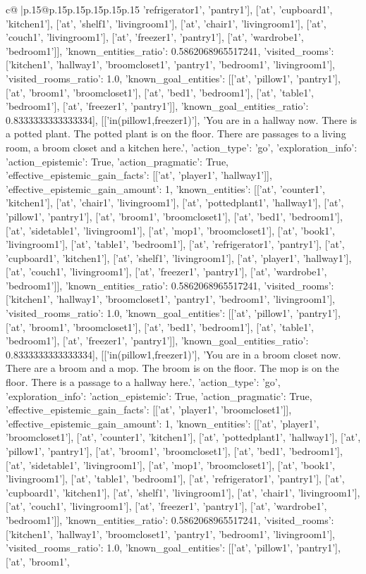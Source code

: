 \documentclass{article}
\begin{document}
{\begin{supertabular}{c@{$\;$}|p{.15\linewidth}@{}p{.15\linewidth}p{.15\linewidth}p{.15\linewidth}p{.15\linewidth}p{.15\linewidth}}
{{{'refrigerator1', 'pantry1'], ['at', 'cupboard1', 'kitchen1'], ['at', 'shelf1', 'livingroom1'], ['at', 'chair1', 'livingroom1'], ['at', 'couch1', 'livingroom1'], ['at', 'freezer1', 'pantry1'], ['at', 'wardrobe1', 'bedroom1']], 'known_entities_ratio': 0.5862068965517241, 'visited_rooms': ['kitchen1', 'hallway1', 'broomcloset1', 'pantry1', 'bedroom1', 'livingroom1'], 'visited_rooms_ratio': 1.0, 'known_goal_entities': [['at', 'pillow1', 'pantry1'], ['at', 'broom1', 'broomcloset1'], ['at', 'bed1', 'bedroom1'], ['at', 'table1', 'bedroom1'], ['at', 'freezer1', 'pantry1']], 'known_goal_entities_ratio': 0.8333333333333334}}], [['in(pillow1,freezer1)'], 'You are in a hallway now. There is a potted plant. The potted plant is on the floor. There are passages to a living room, a broom closet and a kitchen here.', {'action_type': 'go', 'exploration_info': {'action_epistemic': True, 'action_pragmatic': True, 'effective_epistemic_gain_facts': [['at', 'player1', 'hallway1']], 'effective_epistemic_gain_amount': 1, 'known_entities': [['at', 'counter1', 'kitchen1'], ['at', 'chair1', 'livingroom1'], ['at', 'pottedplant1', 'hallway1'], ['at', 'pillow1', 'pantry1'], ['at', 'broom1', 'broomcloset1'], ['at', 'bed1', 'bedroom1'], ['at', 'sidetable1', 'livingroom1'], ['at', 'mop1', 'broomcloset1'], ['at', 'book1', 'livingroom1'], ['at', 'table1', 'bedroom1'], ['at', 'refrigerator1', 'pantry1'], ['at', 'cupboard1', 'kitchen1'], ['at', 'shelf1', 'livingroom1'], ['at', 'player1', 'hallway1'], ['at', 'couch1', 'livingroom1'], ['at', 'freezer1', 'pantry1'], ['at', 'wardrobe1', 'bedroom1']], 'known_entities_ratio': 0.5862068965517241, 'visited_rooms': ['kitchen1', 'hallway1', 'broomcloset1', 'pantry1', 'bedroom1', 'livingroom1'], 'visited_rooms_ratio': 1.0, 'known_goal_entities': [['at', 'pillow1', 'pantry1'], ['at', 'broom1', 'broomcloset1'], ['at', 'bed1', 'bedroom1'], ['at', 'table1', 'bedroom1'], ['at', 'freezer1', 'pantry1']], 'known_goal_entities_ratio': 0.8333333333333334}}], [['in(pillow1,freezer1)'], 'You are in a broom closet now. There are a broom and a mop. The broom is on the floor. The mop is on the floor. There is a passage to a hallway here.', {'action_type': 'go', 'exploration_info': {'action_epistemic': True, 'action_pragmatic': True, 'effective_epistemic_gain_facts': [['at', 'player1', 'broomcloset1']], 'effective_epistemic_gain_amount': 1, 'known_entities': [['at', 'player1', 'broomcloset1'], ['at', 'counter1', 'kitchen1'], ['at', 'pottedplant1', 'hallway1'], ['at', 'pillow1', 'pantry1'], ['at', 'broom1', 'broomcloset1'], ['at', 'bed1', 'bedroom1'], ['at', 'sidetable1', 'livingroom1'], ['at', 'mop1', 'broomcloset1'], ['at', 'book1', 'livingroom1'], ['at', 'table1', 'bedroom1'], ['at', 'refrigerator1', 'pantry1'], ['at', 'cupboard1', 'kitchen1'], ['at', 'shelf1', 'livingroom1'], ['at', 'chair1', 'livingroom1'], ['at', 'couch1', 'livingroom1'], ['at', 'freezer1', 'pantry1'], ['at', 'wardrobe1', 'bedroom1']], 'known_entities_ratio': 0.5862068965517241, 'visited_rooms': ['kitchen1', 'hallway1', 'broomcloset1', 'pantry1', 'bedroom1', 'livingroom1'], 'visited_rooms_ratio': 1.0, 'known_goal_entities': [['at', 'pillow1', 'pantry1'], ['at', 'broom1', }}}
\end{supertabular}}
\end{document}

